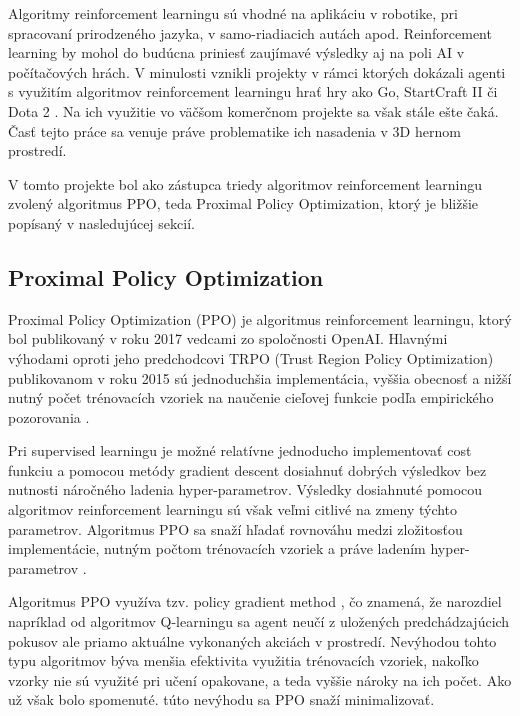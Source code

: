 \documentclass[slovak, master]{diploma}
\begin{document}
Algoritmy reinforcement learningu sú vhodné na aplikáciu v robotike, pri spracovaní prirodzeného jazyka, v samo-riadiacich autách apod. Reinforcement learning by mohol do budúcna priniesť zaujímavé výsledky aj na poli AI v počítačových hrách. V minulosti vznikli projekty v rámci ktorých dokázali agenti s využitím algoritmov reinforcement learningu hrať hry ako Go, StartCraft II či Dota 2 \cite{app13042443}. Na ich využitie vo väčšom komerčnom projekte sa však stále ešte čaká. Časť tejto práce sa venuje práve problematike ich nasadenia v 3D hernom prostredí.

V tomto projekte bol ako zástupca triedy algoritmov reinforcement learningu zvolený algoritmus PPO, teda Proximal Policy Optimization, ktorý je bližšie popísaný v nasledujúcej sekcií.


\subsection{Proximal Policy Optimization}
\label{sec:PPO}
Proximal Policy Optimization (PPO) je algoritmus reinforcement learningu, ktorý bol publikovaný v roku 2017 vedcami zo spoločnosti OpenAI. Hlavnými výhodami oproti jeho predchodcovi TRPO (Trust Region Policy Optimization) publikovanom v roku 2015 sú jednoduchšia implementácia, vyššia obecnosť a nižší nutný počet trénovacích vzoriek na naučenie cieľovej funkcie podľa empirického pozorovania \cite{PPOPaper}.

Pri supervised learningu je možné relatívne jednoducho implementovať cost funkciu a pomocou metódy gradient descent dosiahnuť dobrých výsledkov bez nutnosti náročného ladenia hyper-parametrov. Výsledky dosiahnuté pomocou algoritmov reinforcement learningu sú však veľmi citlivé na zmeny týchto parametrov. Algoritmus PPO sa snaží hľadať rovnováhu medzi zložitosťou implementácie, nutným počtom trénovacích vzoriek a práve ladením hyper-parametrov \cite{PPOPaper}.

Algoritmus PPO využíva tzv. policy gradient method \cite{PPOPaper}, čo znamená, že narozdiel napríklad od algoritmov Q-learningu sa agent neučí z uložených predchádzajúcich pokusov ale priamo aktuálne vykonaných akciách v prostredí. Nevýhodou tohto typu algoritmov býva menšia efektivita využitia trénovacích vzoriek, nakoľko vzorky nie sú využité pri učení opakovane, a teda vyššie nároky na ich počet. Ako už však bolo spomenuté. túto nevýhodu sa PPO snaží minimalizovať.  
\end{document}
